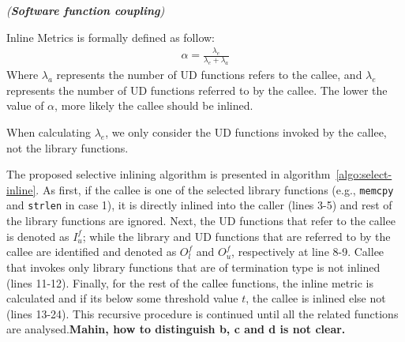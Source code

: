 \begin{mydef} \label{def:comp_semantic}
\emph{(\textbf{Software function coupling})}
\end{mydef}

Inline Metrics is formally defined as follow:
\begin{equation}
\begin{aligned}
 \alpha = \frac{\lambda_e}{\lambda_e + \lambda_a}
\end{aligned}
\end{equation}
Where $\lambda_a$ represents the number of UD functions  refers to the callee, and  $\lambda_e$ represents the number of UD functions  referred to by the callee. The lower the value of $\alpha$, more likely the callee should be inlined.  %

When calculating $\lambda_e$, we only consider the UD functions invoked by the callee, not the library functions. 


The proposed selective inlining algorithm is presented in algorithm~\ref{algo:select-inline}. As first, if the callee is one of the selected library functions (e.g., \texttt{memcpy} and \texttt{strlen} in case 1), it is directly inlined into the caller (lines 3-5) and rest of the library functions are ignored. Next, the UD functions that refer to the callee is denoted as $I_u^f$; while the library and UD functions that are referred to by the callee are identified and denoted as $O_l^f$ and $O_u^f$, respectively at line 8-9. Callee that invokes only library functions that are of termination type is not inlined (lines 11-12). Finally, for the rest of the callee functions, the inline metric is calculated and if its below some threshold value $t$, the callee is inlined else not (lines 13-24). This recursive procedure is continued until all the related functions are analysed.\textbf{Mahin, how to distinguish b, c and d is not clear.}

